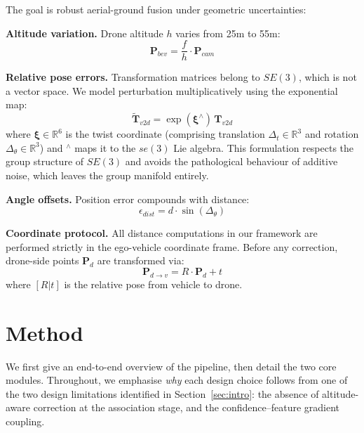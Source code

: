 \documentclass[9.5pt,twocolumn,a4paper]{IEEEtran}
\def\mb#1{\mathbf{#1}}
\begin{document}
The goal is robust aerial-ground fusion under geometric uncertainties:

\textbf{Altitude variation.} Drone altitude $h$ varies from 25m to 55m:
\begin{equation}
    \mb{P}_{bev} = \frac{f}{h} \cdot \mb{P}_{cam}
    \label{eq:altitude_projection}
\end{equation}

\textbf{Relative pose errors.} Transformation matrices belong to $SE(3)$, which is not a vector space. We model perturbation multiplicatively using the exponential map:
\begin{equation}
    \tilde{\mb{T}}_{v2d} = \exp(\boldsymbol{\xi}^\wedge) \, \mb{T}_{v2d}
    \label{eq:pose_error}
\end{equation}
where $\boldsymbol{\xi} \in \mathbb{R}^6$ is the twist coordinate (comprising translation $\Delta_t \in \mathbb{R}^3$ and rotation $\Delta_\theta \in \mathbb{R}^3$) and $^\wedge$ maps it to the $se(3)$ Lie algebra. This formulation respects the group structure of $SE(3)$ and avoids the pathological behaviour of additive noise, which leaves the group manifold entirely.

\textbf{Angle offsets.} Position error compounds with distance:
\begin{equation}
    \epsilon_{dist} = d \cdot \sin(\Delta_\theta)
    \label{eq:angle_error}
\end{equation}

\textbf{Coordinate protocol.} All distance computations in our framework are performed strictly in the ego-vehicle coordinate frame. Before any correction, drone-side points $\mb{P}_d$ are transformed via:
\begin{equation}
    \mb{P}_{d\rightarrow v} = R \cdot \mb{P}_d + t
    \label{eq:coordinate_protocol}
\end{equation}
where $[R|t]$ is the relative pose from vehicle to drone.

\section{Method}
\label{sec:method}

We first give an end-to-end overview of the pipeline, then detail the two core modules. Throughout, we emphasise \emph{why} each design choice follows from one of the two design limitations identified in Section~\ref{sec:intro}: the absence of altitude-aware correction at the association stage, and the confidence--feature gradient coupling.
\end{document}
